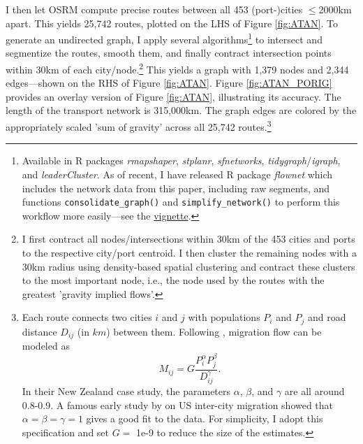 \documentclass[a4paper]{article}
\begin{document}
I then let OSRM compute precise routes between all 453 (port-)cities $\leq$2000km apart. This yields 25,742 routes, plotted on the LHS of Figure \ref{fig:ATAN}. To generate an undirected graph, I apply several algorithms\footnote{Available in R packages \emph{rmapshaper}, \emph{stplanr}, \emph{sfnetworks}, \emph{tidygraph}/\emph{igraph}, and \emph{leaderCluster}. As of recent, I have released R package \emph{flownet} which includes the network data from this paper, including raw segments, and functions \texttt{consolidate\_graph()} and \texttt{simplify\_network()} to perform this workflow more easily---see the \href{https://sebkrantz.github.io/flownet/articles/introduction.html}{vignette}.} to intersect and segmentize the routes, smooth them, and finally contract intersection points within 30km of each city/node.\footnote{I first contract all nodes/intersections within 30km of the 453 cities and ports to the respective city/port centroid. I then cluster the remaining nodes with a 30km radius using density-based spatial clustering and contract these clusters to the most important node, i.e., the node used by the routes with the greatest 'gravity implied flows'.} This yields a graph with 1,379 nodes and 2,344 edges---shown on the RHS of Figure \ref{fig:ATAN}. Figure \ref{fig:ATAN_PORIG} provides an overlay version of Figure \ref{fig:ATAN}, illustrating its accuracy. The length of the transport network is 315,000km. The graph edges are colored by the appropriately scaled 'sum of gravity' across all 25,742 routes.\footnote{Each route connects two cities $i$ and $j$ with populations $P_i$ and $P_j$ and road distance $D_{ij}$ (in $km$) between them. Following \citet{poot2016gravity}, migration flow can be modeled as 
\begin{equation} \label{eq:gravity}
M_{ij} = G \frac{P_i^\alpha P_j^\beta}{D_{ij}^\gamma}.
\end{equation} 
In their New Zealand case study, the parameters $\alpha$, $\beta$, and $\gamma$ are all around 0.8-0.9. A famous early study by \citet{zipf1946p} on US inter-city migration showed that $\alpha=\beta=\gamma=1$ gives a good fit to the data. For simplicity, I adopt this specification and set $G = $ 1e-9 to reduce the size of the estimates. } %
\newline
\end{document}
